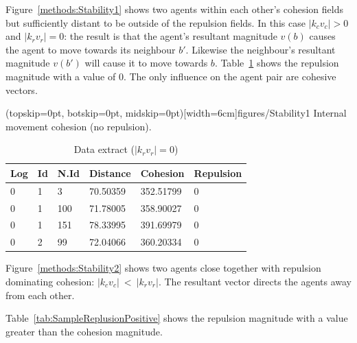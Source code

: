 \documentclass{ieeeaccess}
\begin{document}
Figure~\ref{methods:Stability1} shows two agents within each other's cohesion
fields but sufficiently distant to be outside of the repulsion fields. In this
case $|k_cv_c| > 0$ and $|k_rv_r| = 0$: the result is that the agent's resultant
magnitude $v(b)$ causes the agent to move towards its neighbour $b'$. Likewise
the neighbour's resultant magnitude $v(b')$ will cause it to move towards $b$.
Table~\ref{tab:SampleReplusion0} shows the repulsion magnitude with a value of
0. The only influence on the agent pair are cohesive vectors. 

\Figure[t!](topskip=0pt, botskip=0pt, midskip=0pt)[width=6cm]{figures/Stability1}
{Internal movement cohesion (no repulsion).\label{methods:Stability1}}


\begin{table}[H]
\begin{center}
\begin{tabular}{| l | l | l | l | l | l |}
\hline
Log &	Id &	N.Id &	Distance &	{\color{green}Cohesion} &	{\color{red}Repulsion} 	\\ \hline
0 &	1 &	3 	 & 70.50359 &	{\color{green}352.51799} &	{\color{red}0} \\ \hline
0 &	1 &	100 & 71.78005 &	{\color{green}358.90027} &	{\color{red}0} \\ \hline
0 &	1 &	151 & 78.33995 &	{\color{green}391.69979} &	{\color{red}0} \\ \hline
0 &	2 &	99  &	72.04066 &	{\color{green}360.20334} &	{\color{red}0} \\ 
\hline
\end{tabular}\caption{Data extract ($|k_rv_r| = 0$)} \label{tab:SampleReplusion0}
\end{center}
\end{table}

Figure~\ref{methods:Stability2} shows two agents close together with repulsion
dominating cohesion: $|k_cv_c|~<~|k_rv_r|$. The resultant vector directs the
agents away from each other. 

Table~\ref{tab:SampleReplusionPositive} shows the repulsion magnitude with a
value greater than the cohesion magnitude.
\end{document}
